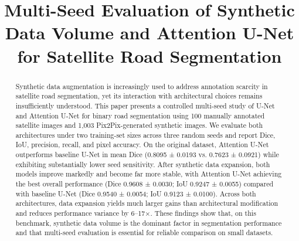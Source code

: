 \documentclass[conference]{IEEEtran}
\begin{document}
\title{Multi-Seed Evaluation of Synthetic Data Volume and Attention U-Net for Satellite Road Segmentation}

\author{
}

\maketitle

\begin{abstract}
Synthetic data augmentation is increasingly used to address annotation scarcity in satellite road segmentation, yet its interaction with architectural choices remains insufficiently understood. This paper presents a controlled multi-seed study of U-Net and Attention U-Net for binary road segmentation using 100 manually annotated satellite images and 1,003 Pix2Pix-generated synthetic images. We evaluate both architectures under two training-set sizes across three random seeds and report Dice, IoU, precision, recall, and pixel accuracy. On the original dataset, Attention U-Net outperforms baseline U-Net in mean Dice (0.8095 ± 0.0193 vs. 0.7623 ± 0.0921) while exhibiting substantially lower seed sensitivity. After synthetic data expansion, both models improve markedly and become far more stable, with Attention U-Net achieving the best overall performance (Dice 0.9608 ± 0.0030; IoU 0.9247 ± 0.0055) compared with baseline U-Net (Dice 0.9540 ± 0.0054; IoU 0.9123 ± 0.0100). Across both architectures, data expansion yields much larger gains than architectural modification and reduces performance variance by 6–17×. These findings show that, on this benchmark, synthetic data volume is the dominant factor in segmentation performance and that multi-seed evaluation is essential for reliable comparison on small datasets.

\end{abstract}
\end{document}
